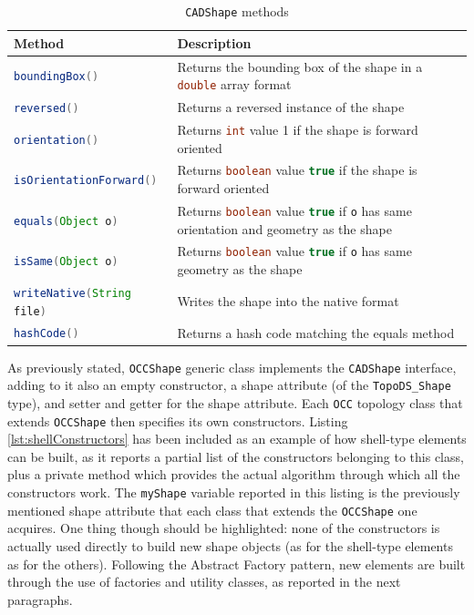 \begin{table}[H]
\centering
\begin{tabular}{p{4.2cm}p{10.3cm}}
\toprule
\textbf{Method} & \textbf{Description} \\
\midrule
\lstinline[language=Java]!boundingBox()! & Returns the bounding box of the shape in a \lstinline[language=Java]!double! array format \\[0.2cm]
\lstinline[language=Java]!reversed()! & Returns a reversed instance of the shape \\[0.2cm]
\lstinline[language=Java]!orientation()! & Returns \lstinline[language=Java]!int! value 1 if the shape is forward oriented \\[0.2cm]
\lstinline[language=Java]!isOrientationForward()! & Returns \lstinline[language=Java]!boolean! value \lstinline[language=Java]!true! if the shape is forward oriented \\[0.2cm]
\lstinline[language=Java]!equals(Object o)! & Returns \lstinline[language=Java]!boolean! value \lstinline[language=Java]!true! if \lstinline[language=Java]!o! has same orientation and geometry as the shape \\[0.2cm]
\lstinline[language=Java]!isSame(Object o)! & Returns \lstinline[language=Java]!boolean! value \lstinline[language=Java]!true! if \lstinline[language=Java]!o! has same geometry as the shape \\[0.2cm]
\lstinline[language=Java]!writeNative(String file)! & Writes the shape into the native format \\[0.2cm]
\lstinline[language=Java]!hashCode()! & Returns a hash code matching the equals method \\
\bottomrule
\end{tabular}
\caption{\lstinline[language=Java]!CADShape! methods}
\label{tab:CADShapeMethods}
\end{table}
%
\noindent
As previously stated, \lstinline[language=Java]!OCCShape! generic class implements the \lstinline[language=Java]!CADShape! interface, adding to it also an empty constructor, a shape attribute (of the \lstinline[language=Java]!TopoDS_Shape! type), and setter and getter for the shape attribute. Each \lstinline[language=Java]!OCC! topology class that extends \lstinline[language=Java]!OCCShape! then specifies its own constructors. Listing \ref{lst:shellConstructors} has been included as an example of how shell-type elements can be built, as it reports a partial list of the constructors belonging to this class, plus a private method which provides the actual algorithm through which all the constructors work. The \lstinline[language=Java]!myShape! variable reported in this listing is the previously mentioned shape attribute that each class that extends the \lstinline[language=Java]!OCCShape! one acquires. One thing though should be highlighted: none of the constructors is actually used directly to build new shape objects (as for the shell-type elements as for the others). Following the Abstract Factory pattern, new elements are built through the use of factories and utility classes, as reported in the next paragraphs. 
